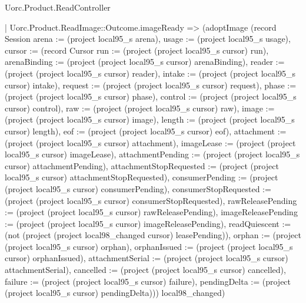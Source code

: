 \begin{lexlean}{Uorc.Product.ReadController}
\begin{semanticmodule}
{      | Uorc.Product.ReadImage::Outcome.imageReady => (adoptImage (record Session {arena := (project local95_s arena), usage := (project local95_s usage), cursor := (record Cursor {run := (project (project local95_s cursor) run), arenaBinding := (project (project local95_s cursor) arenaBinding), reader := (project (project local95_s cursor) reader), intake := (project (project local95_s cursor) intake), request := (project (project local95_s cursor) request), phase := (project (project local95_s cursor) phase), control := (project (project local95_s cursor) control), raw := (project (project local95_s cursor) raw), image := (project (project local95_s cursor) image), length := (project (project local95_s cursor) length), eof := (project (project local95_s cursor) eof), attachment := (project (project local95_s cursor) attachment), imageLease := (project (project local95_s cursor) imageLease), attachmentPending := (project (project local95_s cursor) attachmentPending), attachmentStopRequested := (project (project local95_s cursor) attachmentStopRequested), consumerPending := (project (project local95_s cursor) consumerPending), consumerStopRequested := (project (project local95_s cursor) consumerStopRequested), rawReleasePending := (project (project local95_s cursor) rawReleasePending), imageReleasePending := (project (project local95_s cursor) imageReleasePending), readQuiescent := (not (project (project local98_changed cursor) leasePending)), orphan := (project (project local95_s cursor) orphan), orphanIssued := (project (project local95_s cursor) orphanIssued), attachmentSerial := (project (project local95_s cursor) attachmentSerial), cancelled := (project (project local95_s cursor) cancelled), failure := (project (project local95_s cursor) failure), pendingDelta := (project (project local95_s cursor) pendingDelta)})}) local98_changed)
}
\end{semanticmodule}
\end{lexlean}
